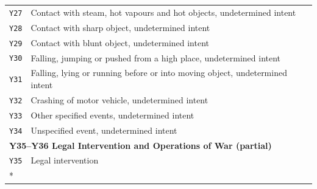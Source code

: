 \begin{longtable}{p{2.2cm} p{10.3cm}}
\texttt{Y27} & Contact with steam, hot vapours and hot objects, undetermined intent \\
\texttt{Y28} & Contact with sharp object, undetermined intent \\
\texttt{Y29} & Contact with blunt object, undetermined intent \\
\texttt{Y30} & Falling, jumping or pushed from a high place, undetermined intent \\
\texttt{Y31} & Falling, lying or running before or into moving object, undetermined intent \\
\texttt{Y32} & Crashing of motor vehicle, undetermined intent \\
\texttt{Y33} & Other specified events, undetermined intent \\
\texttt{Y34} & Unspecified event, undetermined intent \\[6pt]

\multicolumn{2}{l}{\textbf{Y35--Y36 \quad Legal Intervention and Operations of War (partial)}} \\
\midrule
\texttt{Y35} & Legal intervention \\*

\end{longtable}
